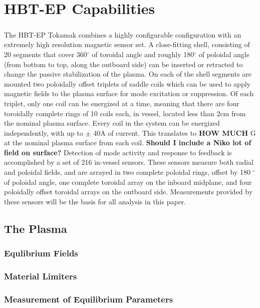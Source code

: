 \chapter{HBT-EP Capabilities}
\paragraph{}The HBT-EP Tokamak combines a highly configurable configuration with an extremely high resolution magnetic sensor set.  A close-fitting shell, consisting of 20 segments that cover 360$^{\circ}$ of toroidal angle and roughly 180$^{\circ}$ of poloidal angle (from bottom to top, along the outboard side) can be inserted or retracted to change the passive stabilization of the plasma.  On each of the shell segments are mounted two poloidally offset triplets of saddle coils which can be used to apply magnetic fields to the plasma surface for mode excitation or suppression.  Of each triplet, only one coil can be energized at a time, meaning that there are four toroidally complete rings of 10 coils each, in vessel, located less than 2cm from the nominal plasma surface.  Every coil in the system can be energized independently, with up to $\pm$ 40A of current.  This translates to \textbf{HOW MUCH} G at the nominal plasma surface from each coil.  \textbf{Should I include a Niko lot of field on surface?}  Detection of mode activity and response to feedback is accomplished by a set of 216 in-vessel sensors.  These sensors measure both radial and poloidal fields, and are arrayed in two complete poloidal rings, offset by 180 $^{\circ}$ of poloidal angle, one complete toroidal array on the inboard midplane, and four poloidally offset toroidal arrays on the outboard side.  Measurements provided by these sensors will be the basis for all analysis in this paper.
\section{The Plasma}
\subsection{Equlibrium Fields}
\subsection{Material Limiters}
\subsection{Measurement of Equilibrium Parameters}
